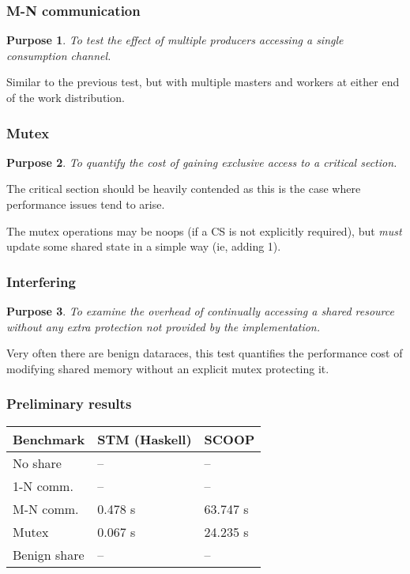 \documentclass{beamer}
\newtheorem{purpose}{Purpose}
\begin{document}
\begin{frame}
  \frametitle{M-N communication}
  \begin{purpose}
    To test the effect of multiple producers accessing a single consumption channel.
  \end{purpose}

  Similar to the previous test, but with multiple masters and workers at either end
  of the work distribution.
\end{frame}

\begin{frame}
  \frametitle{Mutex}
  \begin{purpose}
    To quantify the cost of gaining exclusive access to a critical section.
  \end{purpose}

  The critical section should be heavily contended as this is the case where
  performance issues tend to arise.

  The mutex operations may be noops (if a CS is not explicitly required),
  but \emph{must} update some shared state in a simple way (ie, adding 1).
\end{frame}

\begin{frame}
  \frametitle{Interfering}
  \begin{purpose}
    To examine the overhead of continually accessing a shared resource without
    any extra protection not provided by the implementation.
  \end{purpose}

  Very often there are benign dataraces, this test quantifies the performance
  cost of modifying shared memory without an explicit mutex protecting it.
\end{frame}

\begin{frame}
  \frametitle{Preliminary results}

  \begin{center}
    \begin{tabular}[h]{l|l|l}
      Benchmark    & STM (Haskell) & SCOOP \\ \hline
      No share     &     --        &--     \\
      1-N comm.    &       --      &  --   \\
      M-N comm.    & 0.478 s       & 63.747 s \\
      Mutex        & 0.067 s       & 24.235 s \\
      Benign share &        --     &   --  \\
    \end{tabular}
  \end{center}
\end{frame}
\end{document}
